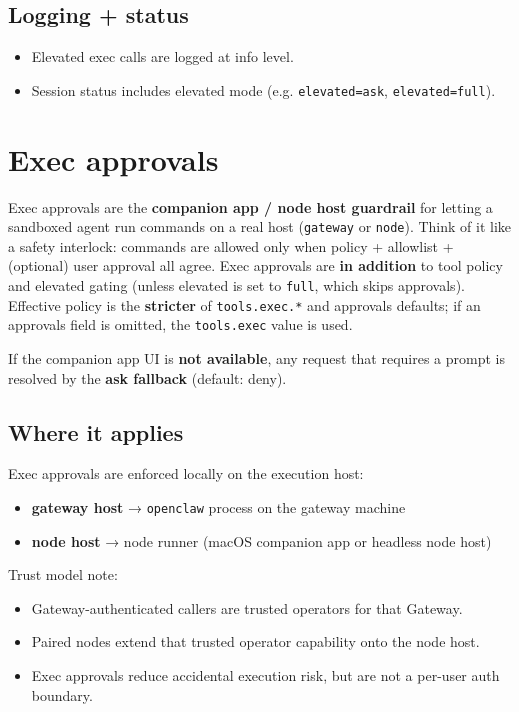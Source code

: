 \subsection{Logging + status}


\begin{itemize}
  \item Elevated exec calls are logged at info level.
  \item Session status includes elevated mode (e.g. \texttt{elevated=ask}, \texttt{elevated=full}).
\end{itemize}



\clearpage

\section{Exec approvals}


Exec approvals are the \textbf{companion app / node host guardrail} for letting a sandboxed agent run
commands on a real host (\texttt{gateway} or \texttt{node}). Think of it like a safety interlock:
commands are allowed only when policy + allowlist + (optional) user approval all agree.
Exec approvals are \textbf{in addition} to tool policy and elevated gating (unless elevated is set to \texttt{full}, which skips approvals).
Effective policy is the \textbf{stricter} of \texttt{tools.exec.*} and approvals defaults; if an approvals field is omitted, the \texttt{tools.exec} value is used.

If the companion app UI is \textbf{not available}, any request that requires a prompt is
resolved by the \textbf{ask fallback} (default: deny).

\subsection{Where it applies}


Exec approvals are enforced locally on the execution host:

\begin{itemize}
  \item \textbf{gateway host} → \texttt{openclaw} process on the gateway machine
  \item \textbf{node host} → node runner (macOS companion app or headless node host)
\end{itemize}


Trust model note:

\begin{itemize}
  \item Gateway-authenticated callers are trusted operators for that Gateway.
  \item Paired nodes extend that trusted operator capability onto the node host.
  \item Exec approvals reduce accidental execution risk, but are not a per-user auth boundary.
\end{itemize}


